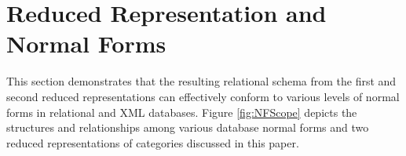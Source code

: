 \vspace{-2mm}

\section{Reduced Representation and Normal Forms}



This section demonstrates that the resulting relational schema from the first and second reduced representations can effectively conform to various levels of normal forms in relational and XML databases.  Figure \ref{fig:NFScope} depicts the structures and relationships among various database normal forms and two reduced representations of categories discussed in this paper.







